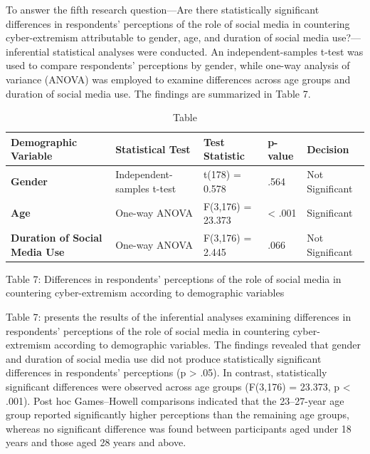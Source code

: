 \documentclass[10pt]{NSP1}
\begin{document}
\par\medskip{}\smallskip

To answer the fifth research question—Are there statistically significant differences in respondents' perceptions of the role of social media in countering cyber-extremism attributable to gender, age, and duration of social media use?—inferential statistical analyses were conducted. An independent-samples t-test was used to compare respondents' perceptions by gender, while one-way analysis of variance (ANOVA) was employed to examine differences across age groups and duration of social media use. The findings are summarized in Table 7.

\begin{table}[tbp]
\centering
{\small
\begin{tabular}{|>{\centering\arraybackslash}p{}|>{\centering\arraybackslash}p{}|>{\centering\arraybackslash}p{}|p{}|>{\centering\arraybackslash}p{}|}
\hline
\cellcolor[HTML]{DDD9C3}\textbf{Demographic Variable} & \cellcolor[HTML]{DDD9C3}\textbf{Statistical Test} & \cellcolor[HTML]{DDD9C3}\textbf{Test Statistic} & \cellcolor[HTML]{DDD9C3}\textbf{p-value} & \cellcolor[HTML]{DDD9C3}\textbf{Decision} \\
\hline
\cellcolor[HTML]{DDD9C3}\textbf{Gender} & Independent-samples t-test & t(178) = 0.578 & .564 & Not Significant \\
\hline
\cellcolor[HTML]{DDD9C3}\textbf{Age} & One-way ANOVA & F(3,176) = 23.373 & \textless{} .001 & Significant \\
\hline
\cellcolor[HTML]{DDD9C3}\textbf{Duration of Social Media Use} & One-way ANOVA & F(3,176) = 2.445 & .066 & Not Significant \\
\hline
\end{tabular}}
\caption{Table}

\end{table}

Table 7: Differences in respondents' perceptions of the role of social media in countering cyber-extremism according to demographic variables

Table 7: presents the results of the inferential analyses examining differences in respondents' perceptions of the role of social media in countering cyber-extremism according to demographic variables. The findings revealed that gender and duration of social media use did not produce statistically significant differences in respondents' perceptions (p \textgreater{} .05). In contrast, statistically significant differences were observed across age groups (F(3,176) = 23.373, p \textless{} .001). Post hoc Games–Howell comparisons indicated that the 23–27-year age group reported significantly higher perceptions than the remaining age groups, whereas no significant difference was found between participants aged under 18 years and those aged 28 years and above.
\end{document}
